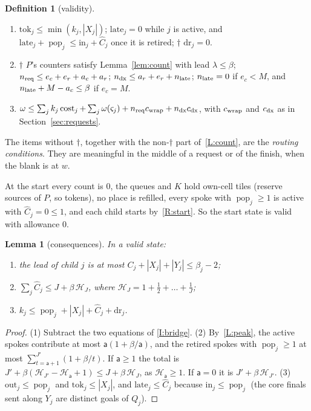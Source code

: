 \documentclass[11pt]{amsart}
\newtheorem{lemma}[theorem]{Lemma}
\theoremstyle{definition}
\newtheorem{definition}[theorem]{Definition}
\newcommand{\pop}{\operatorname{pop}}
\newcommand{\cost}{\operatorname{cost}}
\begin{document}
\begin{definition}[validity]
\begin{enumerate}[label=(L\arabic*),nosep]
  $\pop_j\ge1$ has $\hat C_j\le1+\beta/t_j$, and these $t_j$ are distinct numbers in $\{\mathsf a+1,\dots,J'\}$. Spokes with
  $\pop_j=0$ have $\hat C_j=0$.
\item\label{L:count} $\mathrm{tok}_j\le\min(k_j,|X_j|)$; $\mathrm{late}_j=0$ while $j$ is active, and
  $\mathrm{late}_j+\pop_j\le\mathrm{in}_j+\hat C_j$ once it is retired; $\dagger$ $\mathrm{dr}_j=0$.
\item\label{L:exc} $\dagger$ $P$'s counters satisfy Lemma~\ref{lem:count} with lead $\lambda\le\beta$;
  $n_{\rm req}\le e_c+e_r+a_c+a_r$; $n_{\rm dx}\le a_r+e_r+n_{\rm late}$; $n_{\rm late}=0$ if $e_c<M$, and $n_{\rm late}+M-a_c\le\beta$ if $e_c=M$.
\item\label{L:work} $\omega\le\sum_jk_j\cost_j+\sum_j\omega(\varsigma_j)+n_{\rm req}c_{\rm wrap}+n_{\rm dx}c_{\rm dx}$,
  with $c_{\rm wrap}$ and $c_{\rm dx}$ as in Section~\ref{sec:requests}.
\end{enumerate}
The items without $\dagger$, together with the non-$\dagger$ part of~\ref{L:count}, are the \emph{routing conditions}. They are
meaningful in the middle of a request or of the finish, when the blank is at $w$.
\end{definition}

At the start every count is $0$, the queues and $K$ hold own-cell tiles (reserve sources of $P$, so tokens), no place is
refilled, every spoke with $\pop_j\ge1$ is active with $\hat C_j=0\le1$, and each child starts by~\ref{R:start}.
So the start state is valid with allowance $0$.

\begin{lemma}[consequences]\label{lem:conseq}
In a valid state:
\begin{enumerate}[nosep]
\item\label{c:lead} the lead of child $j$ is at most $C_j+|X_j|+|Y_j|\le\beta_j-2$;
\item\label{c:peak} $\sum_j\hat C_j\le J+\beta\,\mathcal H_J$, where $\mathcal H_J=1+\frac12+\dots+\frac1J$;
\item\label{c:k} $k_j\le\pop_j+|X_j|+\hat C_j+\mathrm{dr}_j$.
\end{enumerate}
\end{lemma}

\begin{proof}
(1) Subtract the two equations of \ref{I:bridge}. (2) By~\ref{L:peak}, the active spokes contribute at most
$\mathsf a(1+\beta/\mathsf a)$, and the retired spokes with $\pop_j\ge1$ at most $\sum_{t=\mathsf a+1}^{J'}(1+\beta/t)$. If $\mathsf a\ge1$
the total is $J'+\beta(\mathcal H_{J'}-\mathcal H_{\mathsf a}+1)\le J+\beta\,\mathcal H_J$, as $\mathcal H_{\mathsf a}\ge1$. If $\mathsf a=0$ it is
$J'+\beta\,\mathcal H_{J'}$. (3) $\mathrm{out}_j\le\pop_j$ and $\mathrm{tok}_j\le|X_j|$, and $\mathrm{late}_j\le\hat C_j$ because
$\mathrm{in}_j\le\pop_j$ (the core finals sent along $Y_j$ are distinct goals of $Q_j$).
\end{proof}
\end{document}
